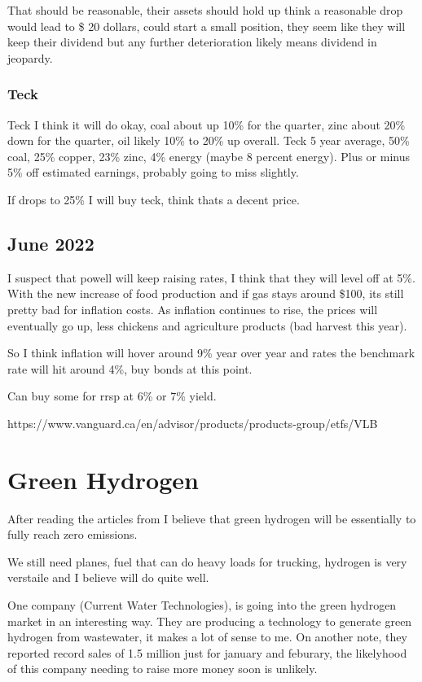 That should be reasonable, their assets should hold up think a reasonable drop would lead to \$ 20 dollars, could start a small position, they seem like they will keep their dividend but any further deterioration likely means dividend in jeopardy.

\subsubsection{Teck}
Teck I think it will do okay, coal about up 10\% for the quarter, zinc about 20\% down for the quarter, oil likely 10\% to 20\% up overall. Teck 5 year average, 50\% coal, 25\% copper, 23\% zinc, 4\% energy (maybe 8 percent energy). Plus or minus 5\% off estimated earnings, probably going to miss slightly.

If drops to 25\% I will buy teck, think thats a decent price.

\subsection{June 2022}

I suspect that powell will keep raising rates, I think that they will level off at 5\%. With the new increase of food production and if gas stays around \$100, its still pretty bad for inflation costs. As inflation continues to rise, the prices will eventually go up, less chickens and agriculture products (bad harvest this year).

So I think inflation will hover around 9\% year over year and rates the benchmark rate will hit around 4\%, buy bonds at this point.

Can buy some for rrsp at 6\% or 7\% yield.

https://www.vanguard.ca/en/advisor/products/products-group/etfs/VLB

\section{Green Hydrogen}
After reading the articles from \cite{goldman_sachs_hydrogen_2022} I believe that green hydrogen will be essentially to fully reach zero emissions.

We still need planes, fuel that can do heavy loads for trucking, hydrogen is very verstaile and I believe will do quite well.

One company  (Current Water Technologies), is going into the green hydrogen market in an interesting way. They are producing a technology to generate green hydrogen from wastewater, it makes a lot of sense to me. On another note, they reported record sales of 1.5 million just for january and feburary, the likelyhood of this company needing to raise more money soon is unlikely.

